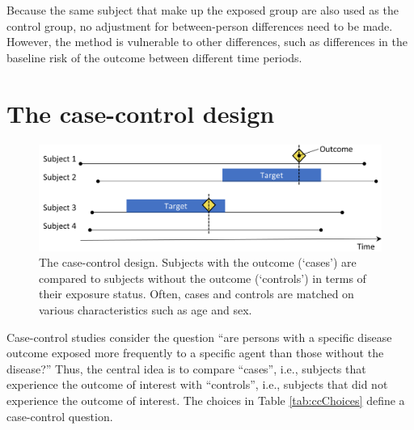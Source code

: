\documentclass[11pt]{book}
\theoremstyle{definition}
\theoremstyle{definition}
\theoremstyle{definition}
\theoremstyle{remark}
\begin{document}
Because the same subject that make up the exposed group are also used as the control group, no adjustment for between-person differences need to be made. However, the method is vulnerable to other differences, such as differences in the baseline risk of the outcome between different time periods.

\hypertarget{the-case-control-design}{%
\section{The case-control design}\label{the-case-control-design}}


\begin{figure}

{\centering \includegraphics[width=0.9\linewidth]{images/PopulationLevelEstimation/caseControl} 

}

\caption{The case-control design. Subjects with the outcome (‘cases’) are compared to subjects without the outcome (‘controls’) in terms of their exposure status. Often, cases and controls are matched on various characteristics such as age and sex.}\label{fig:caseControl}
\end{figure}

Case-control studies \citep{vandenbroucke_2012} consider the question ``are persons with a specific disease outcome exposed more frequently to a specific agent than those without the disease?'' Thus, the central idea is to compare ``cases'', i.e., subjects that experience the outcome of interest with ``controls'', i.e., subjects that did not experience the outcome of interest. The choices in Table \ref{tab:ccChoices} define a case-control question.   
\end{document}
